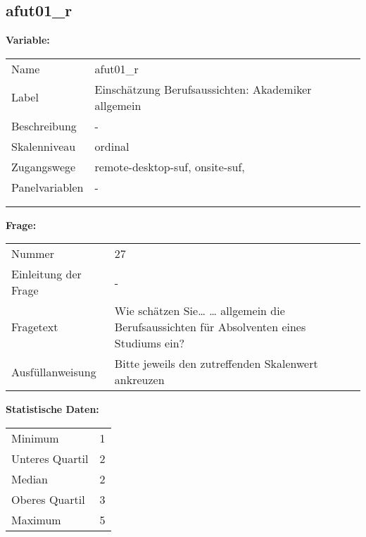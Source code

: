 	
	
	\subsection{afut01\_r}
	\label{subSection:afut01_r}

	\noindent\textbf{Variable:}\\
		\begin{tabular}{lL{11.3cm}}
			\label{tableVariable:afut01_r}
			Name & afut01\_r \\
			Label & Einschätzung Berufsaussichten: Akademiker allgemein \\
			Beschreibung & - \\
			Skalenniveau & ordinal \\
			Zugangswege &
				remote-desktop-suf,
				onsite-suf,
 \\
			Panelvariablen & -
			 \\
			 \\
 \\
		\end{tabular}

		\vspace*{1 cm}
		\noindent\textbf{Frage:}\\
		\begin{tabular}{lL{11.3cm}}
			\label{tableQuestion:afut01_r}
			Nummer & 27 \\
			Einleitung der Frage & - \\
			Fragetext & Wie schätzen Sie…
… allgemein die Berufsaussichten für Absolventen eines Studiums ein? \\
			Ausfüllanweisung & Bitte jeweils den zutreffenden
Skalenwert ankreuzen \\
		\end{tabular}


		\vspace*{1 cm}
		\noindent\textbf{Statistische Daten:}\\
			\begin{tabular}{ll}
				\label{tableStatistics:afut01_r}
					Minimum & 1 \\
					Unteres Quartil & 2 \\
					Median & 2 \\
					Oberes Quartil & 3 \\
					Maximum & 5 \\
			\end{tabular}



